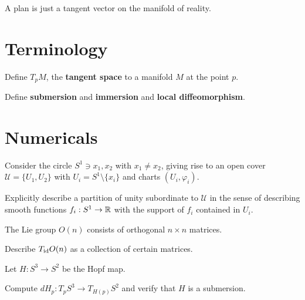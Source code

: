 \documentclass{homework}
\author{Jim Fowler}
\begin{document}
\maketitle

\begin{inspiration}
  A plan is just a tangent vector on the manifold of reality.
\end{inspiration}

\section{Terminology}

\begin{problem}
  Define $T_p M$, the \textbf{tangent space} to a manifold $M$ at the
  point $p$.
\end{problem}

\begin{problem}
  Define \textbf{submersion} and \textbf{immersion} and \textbf{local diffeomorphism}.
\end{problem}

\section{Numericals}

\begin{problem}
  Consider the circle $S^1 \ni x_1, x_2$ with $x_1 \neq x_2$, giving
  rise to an open cover $\mathcal{U} = \{ U_1, U_2 \}$ with
  $U_i = S^1 \setminus \{x_i\}$ and charts $(U_i,\varphi_i)$.

  Explicitly describe a partition of unity subordinate to
  $\mathcal{U}$ in the sense of describing smooth functions
  $f_i : S^1 \to \mathbb{R}$ with the support of $f_i$ contained in $U_i$.
\end{problem}

\begin{problem}
  The Lie group $O(n)$ consists of orthogonal $n \times n$ matrices.

  Describe $T_{\operatorname{id}} O(n)$ as a collection of certain matrices.
\end{problem}

\begin{problem}\label{hopf-map}Let $H : S^3 \to S^2$ be the Hopf map.

  Compute $dH_p : T_p S^3 \to T_{H(p)} S^2$ and verify that $H$ is a
  submersion.
\end{problem}
\end{document}
